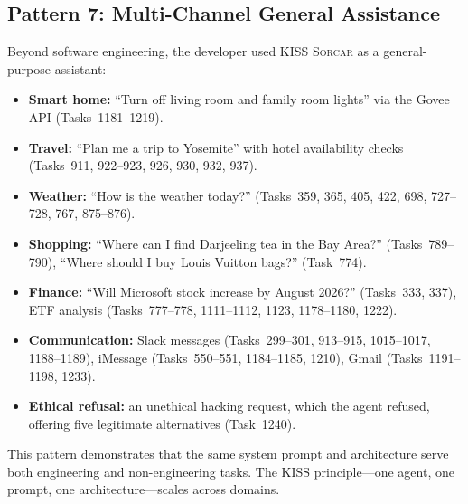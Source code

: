 \documentclass{article}
\newcommand{\kisssys}{\textsc{KISS Sorcar}}
\begin{document}
\subsection{Pattern 7: Multi-Channel General Assistance}
\label{sec:p-general}

Beyond software engineering, the developer used \kisssys{} as a
general-purpose assistant:

\begin{itemize}[nosep]
  \item \textbf{Smart home:} ``Turn off living room and family room
        lights'' via the Govee API (Tasks~1181--1219).
  \item \textbf{Travel:} ``Plan me a trip to Yosemite'' with hotel
        availability checks (Tasks~911, 922--923, 926, 930, 932, 937).
  \item \textbf{Weather:} ``How is the weather today?''
        (Tasks~359, 365, 405, 422, 698, 727--728, 767, 875--876).
  \item \textbf{Shopping:} ``Where can I find Darjeeling tea in the
        Bay Area?'' (Tasks~789--790), ``Where should I buy Louis
        Vuitton bags?'' (Task~774).
  \item \textbf{Finance:} ``Will Microsoft stock increase by August
        2026?'' (Tasks~333, 337), ETF analysis (Tasks~777--778,
        1111--1112, 1123, 1178--1180, 1222).
  \item \textbf{Communication:} Slack messages (Tasks~299--301,
        913--915, 1015--1017, 1188--1189),
        iMessage (Tasks~550--551, 1184--1185, 1210),
        Gmail (Tasks~1191--1198, 1233).
  \item \textbf{Ethical refusal:} an unethical hacking request, which
        the agent refused, offering five legitimate
        alternatives (Task~1240).
\end{itemize}

This pattern demonstrates that the same system prompt and
architecture serve both engineering and non-engineering tasks.
The KISS principle---one agent, one prompt, one architecture---scales
across domains.
\end{document}
